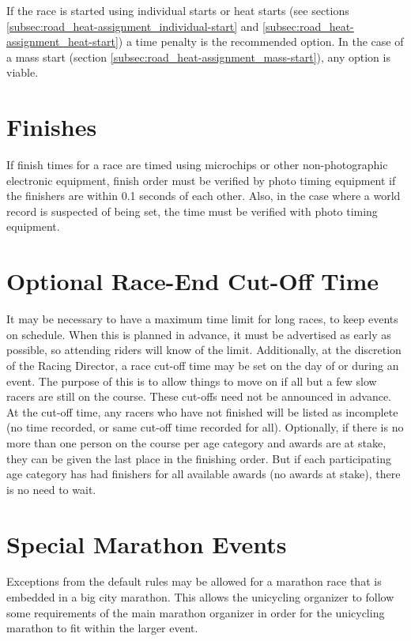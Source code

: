 If the race is started using individual starts or heat starts (see sections \ref{subsec:road_heat-assignment_individual-start} and \ref{subsec:road_heat-assignment_heat-start}) a time penalty is the recommended option.
In the case of a mass start (section \ref{subsec:road_heat-assignment_mass-start}), any option is viable.

\section{Finishes}

If finish times for a race are timed using microchips or other non-photographic electronic equipment, finish order must be verified by photo timing equipment if the finishers are within 0.1 seconds of each other.
Also, in the case where a world record is suspected of being set, the time must be verified with photo timing equipment.

\section{Optional Race-End Cut-Off Time}

It may be necessary to have a maximum time limit for long races, to keep events on schedule.
When this is planned in advance, it must be advertised as early as possible, so attending riders will know of the limit.
Additionally, at the discretion of the Racing Director, a race cut-off time may be set on the day of or during an event.
The purpose of this is to allow things to move on if all but a few slow racers are still on the course.
These cut-offs need not be announced in advance.
At the cut-off time, any racers who have not finished will be listed as incomplete (no time recorded, or same cut-off time recorded for all).
Optionally, if there is no more than one person on the course per age category and awards are at stake, they can be given the last place in the finishing order.
But if each participating age category has had finishers for all available awards (no awards at stake), there is no need to wait.

\section{Special Marathon Events}

Exceptions from the default rules may be allowed for a marathon race that is embedded in a big city marathon.%
This allows the unicycling organizer to follow some requirements of the main marathon organizer in order for the unicycling marathon to fit within the larger event.

